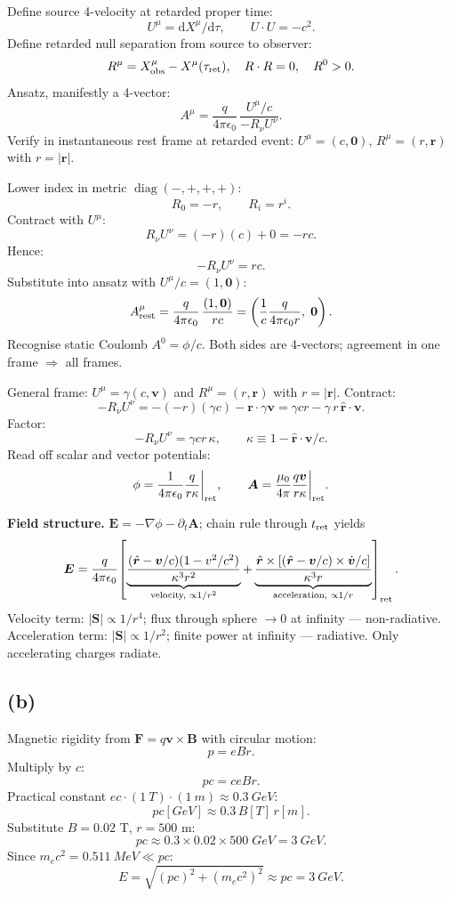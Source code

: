 \documentclass[11pt]{article}
\newcommand{\de}{\mathrm{d}}
\DeclareMathOperator{\diag}{diag}
\begin{document}
Define source 4-velocity at retarded proper time:
\[ U^\mu = \de X^\mu/\de\tau,\qquad U\cdot U = -c^2. \]
Define retarded null separation from source to observer:
\[ R^\mu = X^\mu_{\rm obs} - X^\mu(\tau_{\rm ret}),\quad R\cdot R = 0,\quad R^0 > 0. \]
Ansatz, manifestly a 4-vector:
\begin{equation}
A^\mu = \frac{q}{4\pi\epsilon_0}\,\frac{U^\mu/c}{-R_\nu U^\nu}.
\label{eq:LW}
\end{equation}
Verify in instantaneous rest frame at retarded event: $U^\mu = (c,\bm 0)$, $R^\mu=(r,\bm r)$ with $r=|\bm r|$.

Lower index in metric $\diag(-,+,+,+)$:
\[ R_0 = -r,\qquad R_i = r^i. \]
Contract with $U^\mu$:
\[ R_\nu U^\nu = (-r)(c) + 0 = -rc. \]
Hence:
\[ -R_\nu U^\nu = rc. \]
Substitute into ansatz with $U^\mu/c = (1,\bm 0)$:
\[ A^\mu_{\rm rest} = \frac{q}{4\pi\epsilon_0}\,\frac{(1,\bm 0)}{rc} = \left(\frac{1}{c}\frac{q}{4\pi\epsilon_0 r},\;\bm 0\right). \]
Recognise static Coulomb $A^0 = \phi/c$. Both sides are 4-vectors; agreement in one frame $\Rightarrow$ all frames.

General frame: $U^\mu=\gamma(c,\bm v)$ and $R^\mu = (r,\bm r)$ with $r=|\bm r|$. Contract:
\[ -R_\nu U^\nu = -(-r)(\gamma c) - \bm r\cdot\gamma\bm v = \gamma c r - \gamma\, r\,\hat{\bm r}\cdot\bm v. \]
Factor:
\[ -R_\nu U^\nu = \gamma c r\,\kappa,\qquad \kappa \equiv 1-\hat{\bm r}\cdot\bm v/c. \]
Read off scalar and vector potentials:
\[ \phi = \frac{1}{4\pi\epsilon_0}\frac{q}{r\kappa}\bigg|_{\rm ret},\qquad \bm A = \frac{\mu_0}{4\pi}\frac{q\bm v}{r\kappa}\bigg|_{\rm ret}. \]

\textbf{Field structure.} $\bm E = -\nabla\phi - \partial_t\bm A$; chain rule through $t_{\rm ret}$ yields
\[ \bm E = \frac{q}{4\pi\epsilon_0}\!\left[\underbrace{\frac{(\hat{\bm r}-\bm v/c)(1-v^2/c^2)}{\kappa^3 r^2}}_{\text{velocity, }\propto 1/r^2} + \underbrace{\frac{\hat{\bm r}\times[(\hat{\bm r}-\bm v/c)\times\dot{\bm v}/c]}{\kappa^3 r}}_{\text{acceleration, }\propto 1/r}\right]_{\rm ret}. \]
Velocity term: $|\bm S|\propto 1/r^4$; flux through sphere $\to 0$ at infinity --- non-radiative. Acceleration term: $|\bm S|\propto 1/r^2$; finite power at infinity --- radiative. Only accelerating charges radiate.

\subsection*{(b)}

Magnetic rigidity from $\bm F = q\bm v\times\bm B$ with circular motion:
\[ p = eBr. \]
Multiply by $c$:
\[ pc = ceBr. \]
Practical constant $ec\cdot(\SI{1}{T})\cdot(\SI{1}{m}) \approx \SI{0.3}{GeV}$:
\[ pc[\si{GeV}] \approx 0.3\,B[\si{T}]\,r[\si{m}]. \]
Substitute $B = 0.02$ T, $r = 500$ m:
\[ pc \approx 0.3\times 0.02\times 500\;\si{GeV} = \SI{3}{GeV}. \]
Since $m_ec^2=\SI{0.511}{MeV}\ll pc$:
\[ E = \sqrt{(pc)^2 + (m_e c^2)^2} \approx pc = \SI{3}{GeV}. \]
\end{document}
